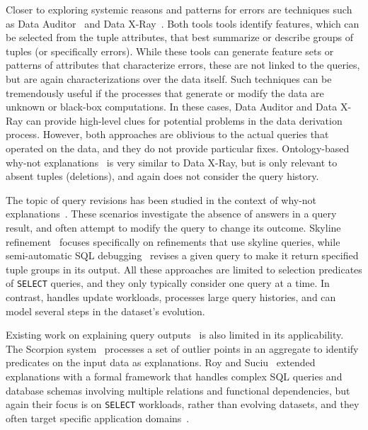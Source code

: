 Closer to exploring systemic reasons and patterns for errors are
techniques such as Data Auditor~\cite{GolabKKS10, Golab2008
} and Data
X-Ray~\cite{wang2015}. Both tools tools identify features, which can
be selected from the tuple attributes, that best summarize or describe
groups of tuples (or specifically errors). While these tools can
generate feature sets or patterns of attributes that characterize
errors, these are not linked to the queries, but are again
characterizations over the data itself. Such techniques can be
tremendously useful if the processes that generate or modify the data
are unknown or black-box computations. In these cases, Data Auditor
and Data X-Ray can provide high-level clues for potential problems in
the data derivation process. However, both approaches are oblivious to
the actual queries that operated on the data, and they do not provide
particular fixes. Ontology-based why-not
explanations~\cite{tenCate2015} is very similar to Data X-Ray, but is
only relevant to absent tuples (deletions), and again does not
consider the query history.

The topic of query revisions has been studied in the context of
why-not explanations~\cite{Chapman2009}. These scenarios investigate
the absence of answers in a query result, and often attempt to modify
the query to change its outcome. Skyline
refinement~\cite{tran2010conquer} focuses specifically on refinements
that use skyline queries, while semi-automatic SQL
debugging~\cite{tzompanaki14semi} revises a given query to make it
return specified tuple groups in its output. All these approaches are
limited to selection predicates of \texttt{SELECT} queries, and they
only typically consider one query at a time. In contrast, \sys handles
update workloads, processes large query histories, and can model
several steps in the dataset's evolution.

Existing work on explaining query outputs~\cite{GebalyAGKS14} is also
limited in its applicability. The Scorpion system~\cite{Wu13}
processes a set of outlier points in an aggregate to identify
predicates on the input data as explanations. Roy and
Suciu~\cite{Roy2014} extended explanations with a formal framework
that handles complex SQL queries and database schemas involving
multiple relations and functional dependencies, but again their focus
is on \texttt{SELECT} workloads, rather than evolving datasets, and
they often target specific application domains~\cite{Khoussainova2012, Thirumuruganathan2012, Das2011, Fabbri2011, Bender14
}.


